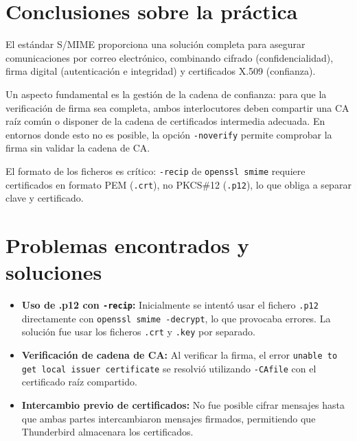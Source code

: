 \documentclass[12pt,a4paper]{report}
\begin{document}
\section{Conclusiones sobre la práctica}

El estándar S/MIME proporciona una solución completa para asegurar comunicaciones por correo electrónico, combinando cifrado (confidencialidad), firma digital (autenticación e integridad) y certificados X.509 (confianza).

Un aspecto fundamental es la gestión de la cadena de confianza: para que la verificación de firma sea completa, ambos interlocutores deben compartir una CA raíz común o disponer de la cadena de certificados intermedia adecuada. En entornos donde esto no es posible, la opción \texttt{-noverify} permite comprobar la firma sin validar la cadena de CA.

El formato de los ficheros es crítico: \texttt{-recip} de \texttt{openssl smime} requiere certificados en formato PEM (\texttt{.crt}), no PKCS\#12 (\texttt{.p12}), lo que obliga a separar clave y certificado.

\section{Problemas encontrados y soluciones}

\begin{itemize}[label=\textbullet]
    \item \textbf{Uso de .p12 con \texttt{-recip}:} Inicialmente se intentó usar el fichero \texttt{.p12} directamente con \texttt{openssl smime -decrypt}, lo que provocaba errores. La solución fue usar los ficheros \texttt{.crt} y \texttt{.key} por separado.
    \item \textbf{Verificación de cadena de CA:} Al verificar la firma, el error \texttt{unable to get local issuer certificate} se resolvió utilizando \texttt{-CAfile} con el certificado raíz compartido.
    \item \textbf{Intercambio previo de certificados:} No fue posible cifrar mensajes hasta que ambas partes intercambiaron mensajes firmados, permitiendo que Thunderbird almacenara los certificados.
\end{itemize}

\end{document}
